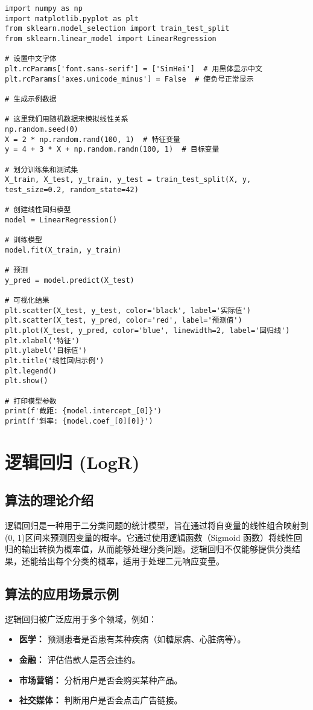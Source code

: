 \begin{lstlisting}
import numpy as np
import matplotlib.pyplot as plt
from sklearn.model_selection import train_test_split
from sklearn.linear_model import LinearRegression

# 设置中文字体
plt.rcParams['font.sans-serif'] = ['SimHei']  # 用黑体显示中文
plt.rcParams['axes.unicode_minus'] = False  # 使负号正常显示

# 生成示例数据

# 这里我们用随机数据来模拟线性关系
np.random.seed(0)
X = 2 * np.random.rand(100, 1)  # 特征变量
y = 4 + 3 * X + np.random.randn(100, 1)  # 目标变量

# 划分训练集和测试集
X_train, X_test, y_train, y_test = train_test_split(X, y, test_size=0.2, random_state=42)

# 创建线性回归模型
model = LinearRegression()

# 训练模型
model.fit(X_train, y_train)

# 预测
y_pred = model.predict(X_test)

# 可视化结果
plt.scatter(X_test, y_test, color='black', label='实际值')
plt.scatter(X_test, y_pred, color='red', label='预测值')
plt.plot(X_test, y_pred, color='blue', linewidth=2, label='回归线')
plt.xlabel('特征')
plt.ylabel('目标值')
plt.title('线性回归示例')
plt.legend()
plt.show()

# 打印模型参数
print(f'截距: {model.intercept_[0]}')
print(f'斜率: {model.coef_[0][0]}')
\end{lstlisting}

\section{逻辑回归 (LogR)}
\subsection*{算法的理论介绍}
逻辑回归是一种用于二分类问题的统计模型，旨在通过将自变量的线性组合映射到(0, 1)区间来预测因变量的概率。它通过使用逻辑函数（Sigmoid 函数）将线性回归的输出转换为概率值，从而能够处理分类问题。逻辑回归不仅能够提供分类结果，还能给出每个分类的概率，适用于处理二元响应变量。

\subsection*{算法的应用场景示例}
逻辑回归被广泛应用于多个领域，例如：
\begin{itemize}
    \item \textbf{医学：} 预测患者是否患有某种疾病（如糖尿病、心脏病等）。
    \item \textbf{金融：} 评估借款人是否会违约。
    \item \textbf{市场营销：} 分析用户是否会购买某种产品。
    \item \textbf{社交媒体：} 判断用户是否会点击广告链接。
\end{itemize}

